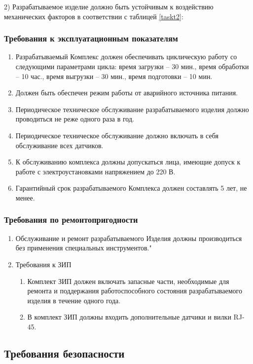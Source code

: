 				2) Разрабатываемое изделие должно быть устойчивым к воздействию механических факторов в соответствии с таблицей \ref{taskt2}:
				

			\subsubsection{Требования к эксплуатационным показателям}
				\begin{enumerate}
					\item Разрабатываемый Комплекс должен обеспечивать циклическую работу со следующими параметрами цикла: время загрузки – 30 мин., время обработки – 10 час., время выгрузки – 30 мин., время подготовки – 10 мин.
					\item Должен быть обеспечен режим работы от аварийного источника питания.
					\item Периодическое техническое обслуживание разрабатываемого изделия должно проводиться не реже одного раза в год.
					\item Периодическое техническое обслуживание должно включать в себя обслуживание всех датчиков.
					\item К обслуживанию комплекса должны допускаться лица, имеющие допуск к работе с электроустановками напряжением до 220 В.
					\item Гарантийный срок разрабатываемого Комплекса должен составлять 5 лет, не менее.
				\end{enumerate}
			\subsubsection{Требования по ремонтопригодности}
				\begin{enumerate}
					\item Обслуживание и ремонт разрабатываемого Изделия должны производиться без применения специальных инструментов."
					\item Требования к ЗИП
						\begin{enumerate}
							\item Комплект ЗИП должен включать запасные части, необходимые для ремонта и поддержания работоспособного состояния разрабатываемого изделия в течение одного года.
							\item В комплект ЗИП должны входить дополнительные датчики и вилки RJ-45.
						\end{enumerate}
				\end{enumerate}
		\subsection{Требования безопасности}
